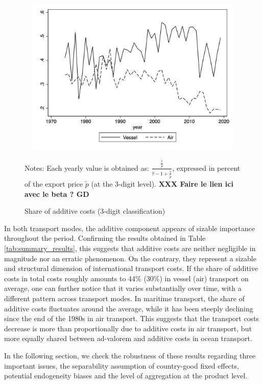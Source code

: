 \documentclass[a4paper,11pt]{article}
\begin{document}
\begin{figure}[htbp]
\caption{Share of additive costs (3-digit classification)}
\label{fig:part_cout_additif}
\begin{center}
 \includegraphics[width=12cm, height=7.5cm]{Figure1_share_of_additive_in_totalTC.jpg}
\begin{minipage} [c]  {5in} \scriptsize%
Notes: Each yearly value is obtained as: $\frac{\frac{\widehat{t}}{\widetilde{p}}}{\widehat{\tau}-1+\frac{\widehat{t}}{\widetilde{p}}}$, expressed in percent of the export price $\widetilde{p}$ (at the 3-digit level). \textbf{XXX Faire le lien ici avec le beta ? GD}
\end{minipage}
\end{center}
\end{figure}


In both transport modes, the additive component appears of sizable importance throughout the period.
Confirming the results obtained in Table \ref{tab:summary_results}, this suggests that additive costs are neither negligible in magnitude nor an erratic phenomenon.
On the contrary, they represent a sizable and structural dimension of international transport costs.
If the share of additive costs in total costs roughly amounts to 44\% (30\%) in vessel (air) transport on average, one can further notice that it varies substantially over time, with a different pattern across transport modes. In maritime transport, the share of additive costs fluctuates around the average, while it has been steeply declining since the end of the 1980s in air transport. This suggests that the transport costs decrease is more than proportionally due to additive costs in air transport, but more equally shared between ad-valorem and additive costs in ocean transport.\smallskip

In the following section, we check the robustness of these results regarding three important issues, the separability assumption of country-good fixed effects, potential endogeneity biases and the level of aggregation at the product level.
\end{document}
